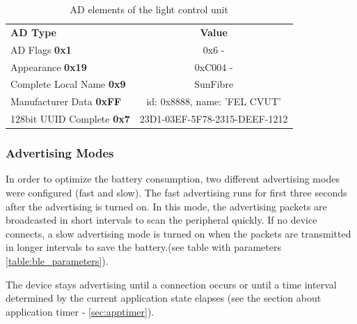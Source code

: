             
            \begin{table}[!ht]
                \begin{tabular}{l!{\vrule width 1pt}c}
                    \textbf{AD Type} &  \textbf{Value}\\ 
                    \Xhline{1\arrayrulewidth}
                    AD Flags \textbf{0x1} & 0x6 - \\
                    Appearance \textbf{0x19} & 0xC004 -  \\
                    Complete Local Name \textbf{0x9} & SunFibre\\
                    Manufacturer Data \textbf{0xFF} & id: 0x8888, name: 'FEL CVUT'\\
                    128bit UUID Complete \textbf{0x7} & 23D1-03EF-5F78-2315-DEEF-1212\\
                \end{tabular}
                \caption{AD elements of the light control unit}
                \label{table:ad_elements}
            \end{table}
            
            
       
        \subsubsection{Advertising Modes}
            In order to optimize the battery consumption, two different advertising modes were configured (fast and slow).  The fast advertising runs for first three seconds after the advertising is turned on. In this mode, the advertising packets are broadcasted in short intervals to scan the peripheral quickly. If no device connects, a slow advertising mode is turned on when the packets are transmitted in longer intervals to save the battery.(see table with parameters \ref{table:ble_parameters}).
            
            The device stays advertising until a connection occurs or until a time interval determined by the current application state elapses (see the section about application timer - \ref{sec:apptimer}). 
            
